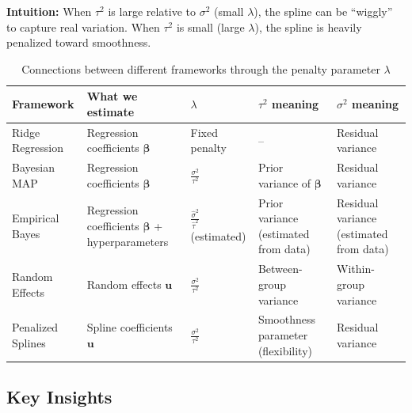 \documentclass[12pt]{article}
\begin{document}
\textbf{Intuition:} When $\tau^2$ is large relative to $\sigma^2$ (small $\lambda$), the spline can be ``wiggly'' to capture real variation. When $\tau^2$ is small (large $\lambda$), the spline is heavily penalized toward smoothness.


\begin{table}[h]
\centering
\begin{tabular}{@{}p{2.5cm}p{2.8cm}p{2.2cm}p{2.5cm}p{2.5cm}@{}}
\toprule
\textbf{Framework} & \textbf{What we estimate} & \textbf{$\lambda$} & \textbf{$\tau^2$ meaning} & \textbf{$\sigma^2$ meaning} \\
\midrule
Ridge Regression & Regression coefficients $\boldsymbol{\beta}$ & Fixed penalty & -- & Residual variance \\
\midrule
Bayesian MAP & Regression coefficients $\boldsymbol{\beta}$ & $\frac{\sigma^2}{\tau^2}$ & Prior variance of $\boldsymbol{\beta}$ & Residual variance \\
\midrule
Empirical Bayes & Regression coefficients $\boldsymbol{\beta}$ + hyperparameters & $\frac{\hat{\sigma}^2}{\hat{\tau}^2}$ (estimated) & Prior variance (estimated from data) & Residual variance (estimated from data) \\
\midrule
Random Effects & Random effects $\mathbf{u}$ & $\frac{\sigma^2}{\tau^2}$ & Between-group variance & Within-group variance \\
\midrule
Penalized Splines & Spline coefficients $\mathbf{u}$ & $\frac{\sigma^2}{\tau^2}$ & Smoothness parameter (flexibility) & Residual variance \\
\bottomrule
\end{tabular}
\caption{Connections between different frameworks through the penalty parameter $\lambda$}
\end{table}

\subsection{Key Insights}
\end{document}
